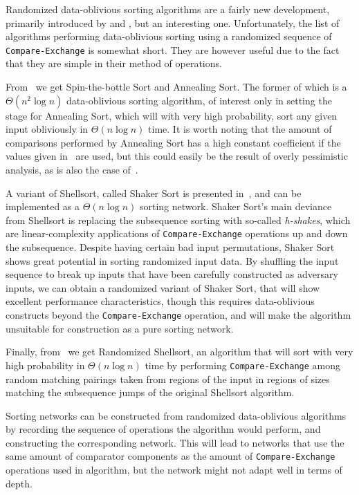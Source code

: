 Randomized data-oblivious sorting algorithms are a fairly new development, primarily introduced by  and , but an interesting one. Unfortunately, the list of algorithms performing data-oblivious sorting using a randomized sequence of \texttt{Compare-Exchange} is somewhat short. They are however useful due to the fact that they are simple in their method of operations.

From~ we get Spin-the-bottle Sort and Annealing Sort. The former of which is a $\Theta(n^2 \log n)$ data-oblivious sorting algorithm, of interest only in setting the stage for Annealing Sort, which will with very high probability, sort any given input obliviously in $\Theta(n \log n)$ time.
It is worth noting that the amount of comparisons performed by Annealing Sort has a high constant coefficient if the values given in~ are used, but this could easily be the result of overly pessimistic analysis, as is also the case of~.

A variant of Shellsort, called Shaker Sort is presented in~, and can be implemented as a $\Theta(n \log n)$ sorting network.
Shaker Sort's main deviance from Shellsort is replacing the subsequence sorting with so-called \emph{h-shakes}, which are linear-complexity applications of \texttt{Compare-Exchange} operations up and down the subsequence. Despite having certain bad input permutations, Shaker Sort shows great potential in sorting randomized input data.
By shuffling the input sequence to break up inputs that have been carefully constructed as adversary inputs, we can obtain a randomized variant of Shaker Sort, that  will show excellent performance characteristics, though this requires data-oblivious constructs beyond the \texttt{Compare-Exchange} operation, and will make the algorithm unsuitable for construction as a pure sorting network.

Finally, from~ we get Randomized Shellsort, an algorithm that will sort with very high probability in $\Theta(n \log n)$ time by performing \texttt{Compare-Exchange} among random matching pairings taken from regions of the input in regions of sizes matching the subsequence jumps of the original Shellsort algorithm.

Sorting networks can be constructed from randomized data-oblivious algorithms by recording the sequence of operations the algorithm would perform, and constructing the corresponding network. This will lead to networks that use the same amount of comparator components as the amount of \texttt{Compare-Exchange} operations used in algorithm, but the network might not adapt well in terms of depth.

